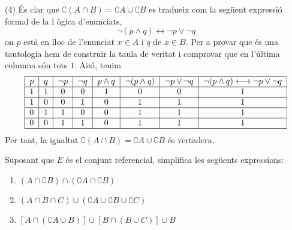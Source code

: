 \begin{solucio}
(4) \'{E}s clar que $\complement \left( A\cap B\right) =\complement A\cup
\complement B$ es tradueix com la seg\"{u}ent expressi\'{o} formal de la l%
\`{o}gica d'enunciats,%
\begin{equation*}
\lnot (p\wedge q)\longleftrightarrow \lnot p\vee \lnot q
\end{equation*}%
on $p$ est\`{a} en lloc de l'enunciat $x\in A$ i $q$ de $x\in B$. Per a
provar que \'{e}s una tautologia hem de construir la taula de veritat i
comprovar que en l'\'{u}ltima columna s\'{o}n tots $1$. Aix\'{\i}, tenim%
\begin{equation*}
\begin{tabular}{|c|c|c|c|c|c|c|c|}
\hline
$p$ & $q$ & $\lnot p$ & $\lnot q$ & $p\wedge q$ & $\lnot (p\wedge q)$ & $%
\lnot p\vee \lnot q$ & $\lnot (p\wedge q)\longleftrightarrow \lnot p\vee
\lnot q$ \\ \hline
$1$ & $1$ & $0$ & $0$ & $1$ & $0$ & $0$ & $1$ \\ \hline
$1$ & $0$ & $0$ & $1$ & $0$ & $1$ & $1$ & $1$ \\ \hline
$0$ & $1$ & $1$ & $0$ & $0$ & $1$ & $1$ & $1$ \\ \hline
$0$ & $0$ & $1$ & $1$ & $0$ & $1$ & $1$ & $1$ \\ \hline
\end{tabular}%
\end{equation*}%
Per tant, la igualtat $\complement \left( A\cap B\right) =\complement A\cup
\complement B$ \'{e}s vertadera.
\end{solucio}

\begin{exercici}
Suposant que $E$ \'{e}s el conjunt referencial, simplifica les seg\"{u}ents
expressions:

\begin{enumerate}
\item $(A\cap \complement B)\cap (\complement A\cap \complement B)$

\item $(A\cap B\cap C)\cup (\complement A\cup \complement B\cup \complement
C)$

\item $\left[ A\cap (\complement A\cup B)\right] \cup \left[ B\cap (B\cup C)%
\right] \cup B$
\end{enumerate}
\end{exercici}

